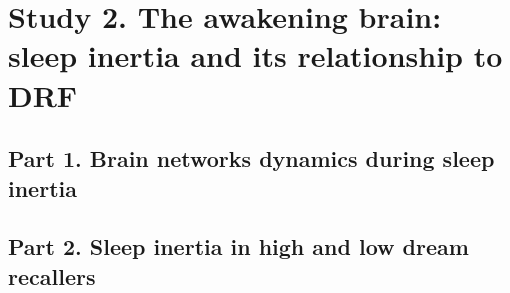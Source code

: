 \cleardoublepage

\chapter{Study 2. The awakening brain: sleep inertia and its relationship to DRF}
\label{res:inertia}

\section{Part 1. Brain networks dynamics during sleep inertia}
\label{res:inertia:inertia}

\cleardoublepage

\section{Part 2. Sleep inertia in high and low dream recallers}
\label{res:inertia:drf}
